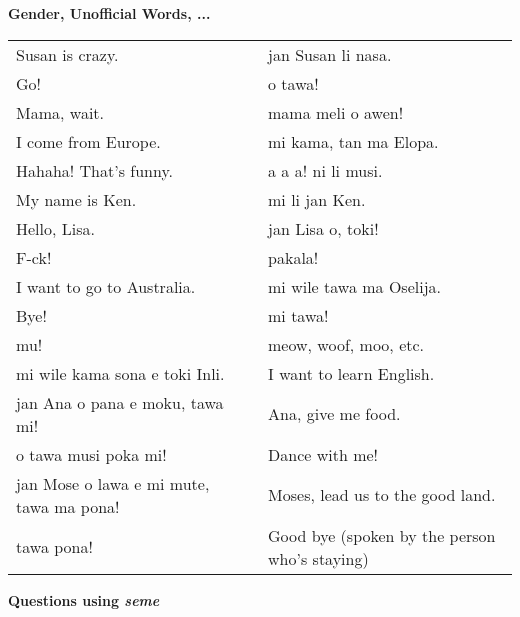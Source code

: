 \textbf{Gender, Unofficial Words, ...} 
\label{'gender_unofficial_words_etc'}

\begin{supertabular}{p{5,5cm}|ll}
Susan is crazy.  && jan Susan li nasa. \\ %
Go!  && o tawa! \\ %
Mama, wait.  && mama meli o awen! \\ %
I come from Europe. && mi kama, tan ma Elopa. \\ %
Hahaha! That's funny.  && a a a! ni li musi. \\ %
My name is Ken.  && mi li jan Ken. \\ %
Hello, Lisa.  && jan Lisa o, toki! \\ %
F-ck! && pakala! \\ %
I want to go to Australia. && mi wile tawa ma Oselija. \\  %
Bye!  && mi tawa!  \\ %
mu!  && meow, woof, moo, etc. \\
mi wile kama sona e toki Inli.  && I want to learn English. \\
jan Ana o pana e moku, tawa mi!  && Ana, give me food. \\
o tawa musi poka mi!  && Dance with me! \\
jan Mose o lawa e mi mute, tawa ma pona!  && Moses, lead us to the good land. \\
tawa pona!  && Good bye (spoken by the person who's staying) \\
\end{supertabular} 

\textbf{Questions using \textit{seme}} 
\label{'questions_using_seme'}

